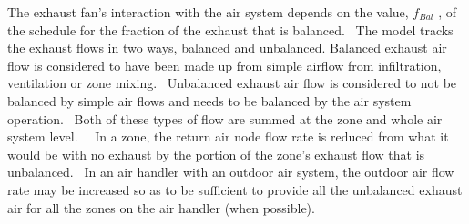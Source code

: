 The exhaust fan's interaction with the air system depends on the value, \({f_{Bal}}\) , of the schedule for the fraction of the exhaust that is balanced.~ The model tracks the exhaust flows in two ways, balanced and unbalanced. Balanced exhaust air flow is considered to have been made up from simple airflow from infiltration, ventilation or zone mixing.~ Unbalanced exhaust air flow is considered to not be balanced by simple air flows and needs to be balanced by the air system operation.~ Both of these types of flow are summed at the zone and whole air system level.~~ In a zone, the return air node flow rate is reduced from what it would be with no exhaust by the portion of the zone's exhaust flow that is unbalanced.~ In an air handler with an outdoor air system, the outdoor air flow rate may be increased so as to be sufficient to provide all the unbalanced exhaust air for all the zones on the air handler (when possible).
